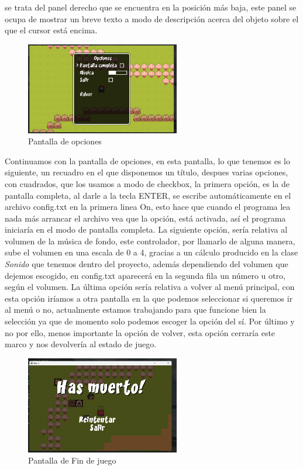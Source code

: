 \documentclass[a4paper]{article}
\begin{document}
se trata del panel derecho que se encuentra en la posición más baja, este panel se ocupa de mostrar un breve texto a modo de descripción acerca del objeto sobre el que el cursor está encima.\\
\begin{figure}[!ht]
    \centering
    \includegraphics[width=0.6\textwidth]{Images/pantalla4tfg.png}
    \caption{Pantalla de opciones}
    \label{fig:pantalla4}
\end{figure}
Continuamos con la pantalla de opciones, en esta pantalla, lo que tenemos es lo siguiente, un recuadro en el que disponemos un título, despues varias opciones, con cuadrados, que los usamos a modo de checkbox, la primera opción, es la de pantalla completa, al darle a la tecla ENTER, se escribe automáticamente en el archivo
config.txt en la primera linea On, esto hace que cuando el programa lea nada más arrancar el archivo vea que la opción, está activada, así el programa iniciaría en el modo de pantalla completa. La siguiente opción, sería relativa al volumen de la música de fondo, este controlador, por llamarlo de alguna manera, sube el volumen en una escala
de 0 a 4, gracias a un cálculo producido en la clase \textit{Sonido} que tenemos dentro del proyecto, además dependiendo del volumen que dejemos escogido, en config.txt aparecerá en la segunda fila un número u otro, según el volumen. La última opción sería relativa a volver al menú principal, con esta opción iríamos a otra pantalla en la que podemos seleccionar si queremos ir al menú o no,
actualmente estamos trabajando para que funcione bien la selección ya que de momento solo podemos escoger la opción del sí. Por último y no por ello, menos importante la opción de volver, esta opción cerraría este marco y nos devolvería al estado de juego.\\
\begin{figure}[!ht]
    \centering
    \includegraphics[width=0.6\textwidth]{Images/pantalla5tfg.png}
    \caption{Pantalla de Fin de juego}
    \label{fig:pantalla5}
\end{figure}
\end{document}

